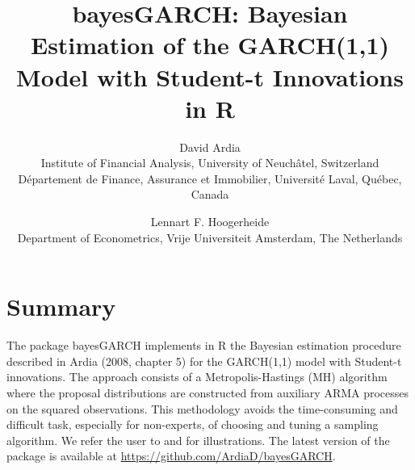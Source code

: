 \documentclass[11pt]{article}
\begin{document}
\title{bayesGARCH: Bayesian Estimation of the GARCH(1,1) Model with Student-t Innovations in R}
\author{David Ardia\\
Institute of Financial Analysis, University of Neuch\^atel, Switzerland\\
D\'epartement de Finance, Assurance et Immobilier, Universit\'e Laval, Qu\'ebec, Canada\and
Lennart F. Hoogerheide\\
Department of Econometrics, Vrije Universiteit Amsterdam, The Netherlands}
	
\maketitle

\section*{Summary}

The package bayesGARCH implements in R \citep{R} the Bayesian estimation procedure described
in Ardia (2008, chapter 5) for the GARCH(1,1) model with  Student-t
innovations. The  approach consists  of  a
Metropolis-Hastings (MH) algorithm where the proposal  distributions  are  constructed  from  auxiliary
ARMA processes on the squared observations.  This methodology avoids the time-consuming and difficult task, 
especially for non-experts, of choosing and tuning a sampling algorithm. We refer the user to \citet{Ardia2008} and \citet{ArdiaHoogerheide2010} for illustrations.
The latest version of the package is available at \url{https://github.com/ArdiaD/bayesGARCH}.



	
\end{document}
